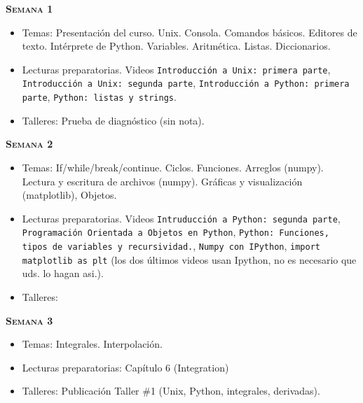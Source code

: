 \documentclass[letterpaper,10pt,onecolumn]{article}
\begin{document}
\noindent\textbf{\textsc{Semana 1}}\\[-0.5cm]
\begin{itemize}
\item Temas: 
Presentaci\'on del curso. Unix. Consola. Comandos b\'asicos. Editores
de texto. Int\'erprete de
Python. Variables. Aritm\'etica. Listas. Diccionarios.\\[-0.6cm] 
\item Lecturas preparatorias. Videos \texttt{Introducci\'on a Unix:
  primera parte}, \texttt{Introducci\'on a Unix: segunda parte},
  \texttt{Introducci\'on a Python: primera parte}, \texttt{Python:
    listas y strings}.\\[-0.6cm] 
\item Talleres: Prueba de diagn\'ostico (sin nota). \\[-0.6cm]
\end{itemize}

\noindent\textbf{\textsc{Semana 2}}\\[-0.5cm]
\begin{itemize}
\item Temas: If/while/break/continue. Ciclos. Funciones. Arreglos
(numpy). Lectura y escritura de archivos (numpy). Gr\'aficas y
visualizaci\'on (matplotlib), Objetos. \\[-0.6cm]
\item Lecturas preparatorias. Videos \texttt{Intruducci\'on a Python:
  segunda parte}, \texttt{Programaci\'on Orientada a Objetos en
  Python}, \texttt{Python: Funciones, tipos de
  variables y recursividad.}, \texttt{Numpy con IPython}, 
  \texttt{import matplotlib as plt} (los dos \'ultimos videos usan
  Ipython, no es necesario que uds. lo hagan asi.). \\[-0.6cm] 
\item Talleres: \\[-0.6cm]
\end{itemize}


\noindent\textbf{\textsc{Semana 3}}\\[-0.5cm]
\begin{itemize}
\item Temas: Integrales. Interpolaci\'on. \\[-0.6cm]
\item Lecturas preparatorias: Cap\'itulo 6 (Integration) \\[-0.6cm]
\item Talleres: Publicaci\'on Taller \#1 (Unix, Python, integrales,
  derivadas). \\[-0.6cm] 
\end{itemize}
\end{document}
